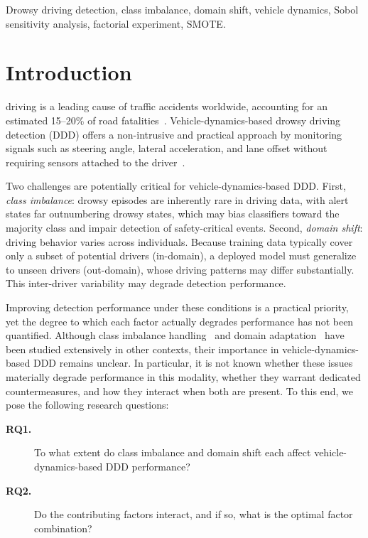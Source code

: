 \documentclass[lettersize,journal]{IEEEtran}
\begin{document}
\begin{IEEEkeywords}
Drowsy driving detection, class imbalance, domain shift, vehicle dynamics, Sobol sensitivity analysis, factorial experiment, SMOTE.
\end{IEEEkeywords}

\section{Introduction}
 driving is a leading cause of traffic accidents worldwide, accounting for an estimated 15--20\% of road fatalities~\cite{who2018}. Vehicle-dynamics-based drowsy driving detection (DDD) offers a non-intrusive and practical approach by monitoring signals such as steering angle, lateral acceleration, and lane offset without requiring sensors attached to the driver~\cite{fu2024,fonseca2025}.

Two challenges are potentially critical for vehicle-dynamics-based DDD.
First, \emph{class imbalance}: drowsy episodes are inherently rare in driving data, with alert states far outnumbering drowsy states, which may bias classifiers toward the majority class and impair detection of safety-critical events.
Second, \emph{domain shift}: driving behavior varies across individuals. Because training data typically cover only a subset of potential drivers (in-domain), a deployed model must generalize to unseen drivers (out-domain), whose driving patterns may differ substantially. This inter-driver variability may degrade detection performance.

Improving detection performance under these conditions is a practical priority, yet the degree to which each factor actually degrades performance has not been quantified.
Although class imbalance handling~\cite{chawla2002,he2009} and domain adaptation~\cite{pan2010,weiss2016} have been studied extensively in other contexts, their importance in vehicle-dynamics-based DDD remains unclear.
In particular, it is not known whether these issues materially degrade performance in this modality, whether they warrant dedicated countermeasures, and how they interact when both are present.
To this end, we pose the following research questions:
\begin{description}
\item[\textbf{RQ1.}] To what extent do class imbalance and domain shift each affect vehicle-dynamics-based DDD performance?
\item[\textbf{RQ2.}] Do the contributing factors interact, and if so, what is the optimal factor combination?
\end{description}
\end{document}
